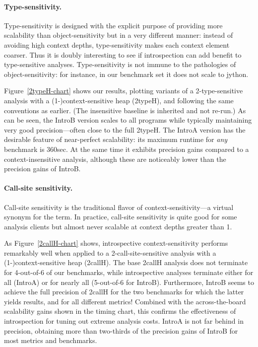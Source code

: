 \paragraph{Type-sensitivity.}
Type-sensitivity is designed with the explicit purpose of providing
more scalability than object-sensitivity but in a very different
manner: instead of avoiding high context depths, type-sensitivity
makes each context element coarser. Thus it is doubly interesting to
see if introspection can add benefit to type-sensitive analyses.
Type-sensitivity is not immune to the pathologies of
object-sensitivity: for instance, in our benchmark set it does not
scale to jython. 

Figure~\ref{2typeH-chart} shows our results, plotting variants of a
2-type-sensitive analysis with a (1-)context-sensitive heap (2typeH),
and following the same conventions as earlier. (The insensitive
baseline is inherited and not re-run.) As can be seen, the IntroB
version scales to all programs while typically maintaining very good
precision---often close to the full 2typeH. The IntroA version has the
desirable feature of near-perfect scalability: its maximum runtime for
\emph{any} benchmark is 360sec. At the same time it exhibits precision
gains compared to a context-insensitive analysis, although these are
noticeably lower than the precision gains of IntroB.

\paragraph{Call-site sensitivity.}
Call-site sensitivity is the traditional flavor of
context-sensitivity---a virtual synonym for the term. In practice,
call-site sensitivity is quite good for some analysis clients but
almost never scalable at context depths greater than 1. 

As Figure~\ref{2callH-chart} shows, introspective context-sensitivity
performs remarkably well when applied to a 2-call-site-sensitive
analysis with a (1-)context-sensitive heap (2callH). The base 2callH
analysis does not terminate for 4-out-of-6 of our benchmarks, while
introspective analyses terminate either for all (IntroA) or for nearly
all (5-out-of-6 for IntroB).  Furthermore, IntroB seems to achieve the
full precision of 2callH for the two benchmarks for which the latter
yields results, and for all different metrics! Combined with the
across-the-board scalability gains shown in the timing chart, this
confirms the effectiveness of introspection for tuning out extreme
analysis costs.  IntroA is not far behind in precision, obtaining more
than two-thirds of the precision gains of IntroB for most metrics and
benchmarks.


